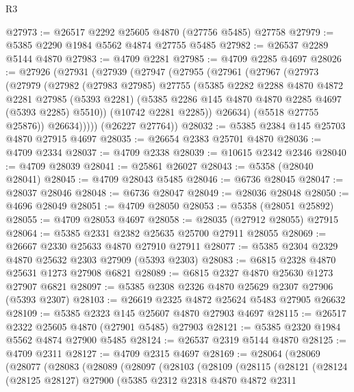 \begin{lexlean}{R3}
\begin{coremodule}
@27973 := @26517 @2292 @25605 @4870 (@27756 @5485) @27758
@27979 := @5385 @2290 @1984 @5562 @4874 @27755 @5485
@27982 := @26537 @2289 @5144 @4870
@27983 := @4709 @2281
@27985 := @4709 @2285 @4697
@28026 := @27926
    (@27931
      (@27939
        (@27947
          (@27955
            (@27961
              (@27967
                (@27973
                  (@27979
                    (@27982
                      (@27983 @27985)
                      @27755
                      (@5385
                        @2282
                        @2288
                        @4870
                        @4872
                        @2281
                        @27985
                        (@5393 @2281)
                        (@5385 @2286 @145 @4870 @4870 @2285 @4697 (@5393 @2285) @5510))
                      (@10742 @2281 @2285))
                    @26634)
                  (@5518 @27755 @25876))
                @26634)))))
      (@26227 @27764))
@28032 := @5385 @2384 @145 @25703 @4870 @27915 @4697
@28035 := @26654 @2383 @25701 @4870
@28036 := @4709 @2334
@28037 := @4709 @2338
@28039 := @10615 @2342 @2346
@28040 := @4709 @28039
@28041 := @25861 @26027
@28043 := @5358 (@28040 @28041)
@28045 := @4709 @28043 @5485
@28046 := @6736 @28045
@28047 := @28037 @28046
@28048 := @6736 @28047
@28049 := @28036 @28048
@28050 := @4696 @28049
@28051 := @4709 @28050
@28053 := @5358 (@28051 @25892)
@28055 := @4709 @28053 @4697
@28058 := @28035 (@27912 @28055) @27915
@28064 := @5385 @2331 @2382 @25635 @25700 @27911 @28055
@28069 := @26667 @2330 @25633 @4870 @27910 @27911
@28077 := @5385 @2304 @2329 @4870 @25632 @2303 @27909 (@5393 @2303)
@28083 := @6815 @2328 @4870 @25631 @1273 @27908 @6821
@28089 := @6815 @2327 @4870 @25630 @1273 @27907 @6821
@28097 := @5385 @2308 @2326 @4870 @25629 @2307 @27906 (@5393 @2307)
@28103 := @26619 @2325 @4872 @25624 @5483 @27905 @26632
@28109 := @5385 @2323 @145 @25607 @4870 @27903 @4697
@28115 := @26517 @2322 @25605 @4870 (@27901 @5485) @27903
@28121 := @5385 @2320 @1984 @5562 @4874 @27900 @5485
@28124 := @26537 @2319 @5144 @4870
@28125 := @4709 @2311
@28127 := @4709 @2315 @4697
@28169 := @28064
    (@28069
      (@28077
        (@28083
          (@28089
            (@28097
              (@28103
                (@28109
                  (@28115
                    (@28121
                      (@28124
                        (@28125 @28127)
                        @27900
                        (@5385
                          @2312
                          @2318
                          @4870
                          @4872
                          @2311

\end{coremodule}
\end{lexlean}
